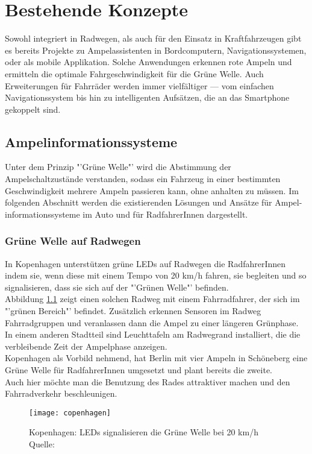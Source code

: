 \chapter{\label{chap:state}Bestehende Konzepte}
Sowohl integriert in Radwegen, als auch für den Einsatz in Kraftfahrzeugen gibt es bereits Projekte zu Ampelassistenten in Bordcomputern, Navigationssystemen, oder als mobile Applikation. Solche Anwendungen erkennen rote Ampeln und ermitteln die optimale Fahrgeschwindigkeit für die Grüne Welle. Auch Erweiterungen für Fahrräder werden immer vielfältiger --- vom einfachen Navigationssystem bis hin zu intelligenten Aufsätzen, die an das \gls{Smartphone} gekoppelt sind.
\section{Ampelinformationssysteme}
Unter dem Prinzip "'Grüne Welle"' wird die Abstimmung der Ampelschaltzustände verstanden, sodass ein Fahrzeug in einer bestimmten Geschwindigkeit mehrere Ampeln passieren kann, ohne anhalten zu müssen. Im folgenden Abschnitt werden die existierenden Lösungen und Ansätze für Ampel- informationssysteme im Auto und für RadfahrerInnen dargestellt.
\subsection{Grüne Welle auf Radwegen}
In Kopenhagen unterstützen grüne \glspl{LED} auf Radwegen die RadfahrerInnen indem sie, wenn diese mit einem Tempo von 20 km/h fahren, sie begleiten und so signalisieren, dass sie sich auf der "'Grünen Welle"' befinden.\\
Abbildung \ref{fig:copenhagen} zeigt einen solchen Radweg mit einem Fahrradfahrer, der sich im "'grünen Bereich"' befindet. Zusätzlich erkennen Sensoren im Radweg Fahrradgruppen und veranlassen dann die Ampel zu einer längeren Grünphase. In einem anderen Stadtteil sind Leuchttafeln am Radwegrand installiert, die die verbleibende Zeit der Ampelphase anzeigen. \cite{KopIng}\\
Kopenhagen als Vorbild nehmend, hat Berlin mit vier Ampeln in Schöneberg eine Grüne Welle für RadfahrerInnen umgesetzt und plant bereits die zweite. \cite{BZ}\\ 
Auch hier möchte man die Benutzung des Rades attraktiver machen und den Fahrradverkehr beschleunigen.
\begin{figure}[H]  
    \centering  
    \texttt{[image: copenhagen]} 
    \grayRule
    \caption[Grüne Welle durch \glspl{LED}]{Kopenhagen: \glspl{LED} signalisieren die Grüne Welle bei 20 km/h  Quelle: \cite{NYT}}
     \label{fig:copenhagen}
\end{figure}
